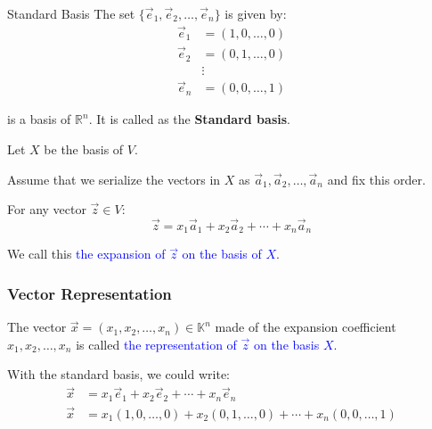 \documentclass[aspectratio=169,xcolor=dvipsnames,svgnames,x11names,fleqn]{beamer}
\begin{document}
\begin{frame}{Standard Basis}
    The set $\{\vec{e}_1, \vec{e}_2, \ldots, \vec{e}_n\}$ is given by:
\begin{align}
\vec{e}_1 &= (1, 0, \ldots, 0) \\
\vec{e}_2 &= (0, 1, \ldots, 0) \\
&\vdots \\
\vec{e}_n &= (0, 0, \ldots, 1)
\end{align}

is a basis of $\mathbb{R}^n$. It is called as the \textbf{Standard basis}.

\vspace{0.5cm}

Let $X$ be the basis of $V$.

Assume that we serialize the vectors in $X$ as $\vec{a}_1, \vec{a}_2, \ldots, \vec{a}_n$ and fix this order.

For any vector $\vec{z} \in V$:
$$\vec{z} = x_1\vec{a}_1 + x_2\vec{a}_2 + \cdots + x_n\vec{a}_n$$

We call this \textcolor{blue}{the expansion of $\vec{z}$ on the basis of $X$}.

    
\end{frame}

\begin{frame}
\frametitle{Vector Representation}

The vector $\vec{x} = (x_1, x_2, \ldots, x_n) \in \mathbb{K}^n$ made of the expansion coefficient $x_1, x_2, \ldots, x_n$ is called \textcolor{blue}{the representation of $\vec{z}$ on the basis $X$}.

\vspace{0.5cm}

With the standard basis, we could write:
\begin{align}
\vec{x} &= x_1\vec{e}_1 + x_2\vec{e}_2 + \cdots + x_n\vec{e}_n \\
\vec{x} &= x_1(1,0,\ldots,0) + x_2(0,1,\ldots,0) + \cdots + x_n(0,0,\ldots,1)
\end{align}

\vspace{0.3cm}

\end{frame}
\end{document}
